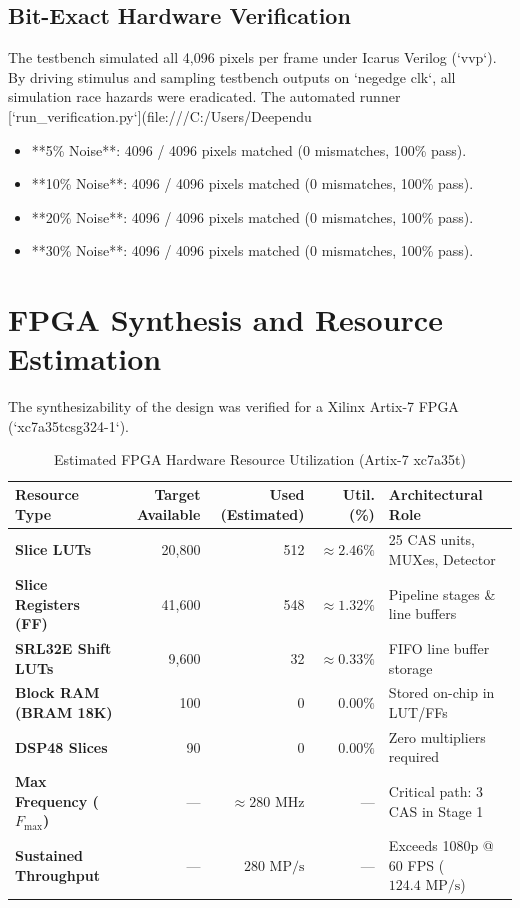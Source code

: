 \documentclass[12pt,a4paper]{article}
\begin{document}
\subsection{Bit-Exact Hardware Verification}
The testbench simulated all 4,096 pixels per frame under Icarus Verilog (`vvp`). By driving stimulus and sampling testbench outputs on `negedge clk`, all simulation race hazards were eradicated. The automated runner [`run_verification.py`](file:///C:/Users/Deependu%
\begin{itemize}
    \item **5\% Noise**: 4096 / 4096 pixels matched ($0$ mismatches, 100\% pass).
    \item **10\% Noise**: 4096 / 4096 pixels matched ($0$ mismatches, 100\% pass).
    \item **20\% Noise**: 4096 / 4096 pixels matched ($0$ mismatches, 100\% pass).
    \item **30\% Noise**: 4096 / 4096 pixels matched ($0$ mismatches, 100\% pass).
\end{itemize}

\section{FPGA Synthesis and Resource Estimation}

The synthesizability of the design was verified for a Xilinx Artix-7 FPGA (`xc7a35tcsg324-1`).

\begin{table}[htbp]
\centering
\caption{Estimated FPGA Hardware Resource Utilization (Artix-7 xc7a35t)}
\label{tab:utilization}
\begin{tabularx}{\textwidth}{lrrrX}
\toprule
\textbf{Resource Type} & \textbf{Target Available} & \textbf{Used (Estimated)} & \textbf{Util. (\%)} & \textbf{Architectural Role} \\
\midrule
\textbf{Slice LUTs} & 20,800 & 512 & $\approx 2.46\%$ & 25 CAS units, MUXes, Detector \\
\textbf{Slice Registers (FF)} & 41,600 & 548 & $\approx 1.32\%$ & Pipeline stages \& line buffers \\
\textbf{SRL32E Shift LUTs} & 9,600 & 32 & $\approx 0.33\%$ & FIFO line buffer storage \\
\textbf{Block RAM (BRAM 18K)} & 100 & 0 & $0.00\%$ & Stored on-chip in LUT/FFs \\
\textbf{DSP48 Slices} & 90 & 0 & $0.00\%$ & Zero multipliers required \\
\textbf{Max Frequency ($F_{\max}$)} & --- & $\approx 280\text{ MHz}$ & --- & Critical path: 3 CAS in Stage 1 \\
\textbf{Sustained Throughput} & --- & $280\text{ MP/s}$ & --- & Exceeds 1080p @ 60 FPS ($124.4\text{ MP/s}$) \\
\bottomrule
\end{tabularx}
\end{table}
\end{document}
